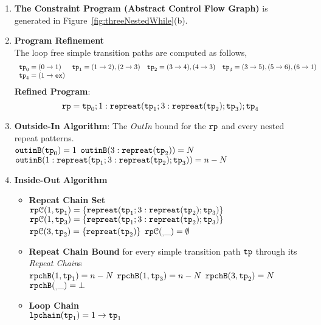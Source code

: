 \begin{enumerate}
  \item  \textbf{The Constraint Program (Abstract Control Flow Graph)} is generated in Figure~\ref{fig:threeNestedWhile}(b).

  \item \textbf{Program Refinement}
  \\
  The loop free simple transition paths are computed as follows,
  \[
      \begin{array}{llll}
          \mathtt{tp}_0 = (0 \to 1)
          &
          \mathtt{tp}_1 = (1 \to 2), (2 \to 3)
          &           
          \mathtt{tp}_2 = (3 \to 4), (4 \to 3)
          &
          \mathtt{tp}_3 = (3 \to 5), (5 \to 6), (6 \to 1)
          \\
          \mathtt{tp}_4 = (1 \to \mathtt{ex})
      \end{array}
      \]
  \textbf{Refined Program}:
  \[
  \mathtt{rp} = \mathtt{tp}_0 ; 1: \mathtt{repreat}(\mathtt{tp}_1; 3: \mathtt{repreat}(\mathtt{tp}_2); \mathtt{tp}_3); \mathtt{tp}_4
  \]
  \item \textbf{Outside-In Algorithm}: The \emph{OutIn} bound for the $\mathtt{rp}$ and every nested repeat patterns.
  \\
$\mathtt{outinB}(\mathtt{tp}_0) = 1$
\quad
$\mathtt{outinB}(3: \mathtt{repreat}(\mathtt{tp}_2)) = N $
\\
$\mathtt{outinB}(1: \mathtt{repreat}(\mathtt{tp}_1; 3: \mathtt{repreat}(\mathtt{tp}_2); \mathtt{tp}_3)) = n - N $
\item \textbf{Inside-Out Algorithm}
\begin{itemize}
  \item \textbf{Repeat Chain Set}
  \\
  $\mathtt{rp}\mathcal{C}(1, \mathtt{tp}_1) = \{\mathtt{repreat}(\mathtt{tp}_1; 3: \mathtt{repreat}(\mathtt{tp}_2); \mathtt{tp}_3)\}$
  \\
  $\mathtt{rp}\mathcal{C}(1, \mathtt{tp}_3) = \{\mathtt{repreat}(\mathtt{tp}_1; 3: \mathtt{repreat}(\mathtt{tp}_2); \mathtt{tp}_3)\}$
  \\
  $\mathtt{rp}\mathcal{C}(3, \mathtt{tp}_2) = \{\mathtt{repreat}(\mathtt{tp}_2)\}$ \quad
  $\mathtt{rp}\mathcal{C}(_, \_) = \emptyset$ 
  \item \textbf{Repeat Chain Bound} for every simple transition path $\mathtt{tp}$ through its \emph{Repeat Chain}s
  \\
  $\mathtt{rpchB}(1, \mathtt{tp}_1) = n - N$ \quad
  $\mathtt{rpchB}(1, \mathtt{tp}_3) = n - N$ \quad
  $\mathtt{rpchB}(3, \mathtt{tp}_2) = N$ \quad
  $\mathtt{rpchB}(_, \_) = \bot $ 
  \item \textbf{Loop Chain}
  \\
  $\mathtt{lpchain}(\mathtt{tp}_1) = 1\to \mathtt{tp}_1$ \quad
   \quad

\end{itemize}
\end{enumerate}
